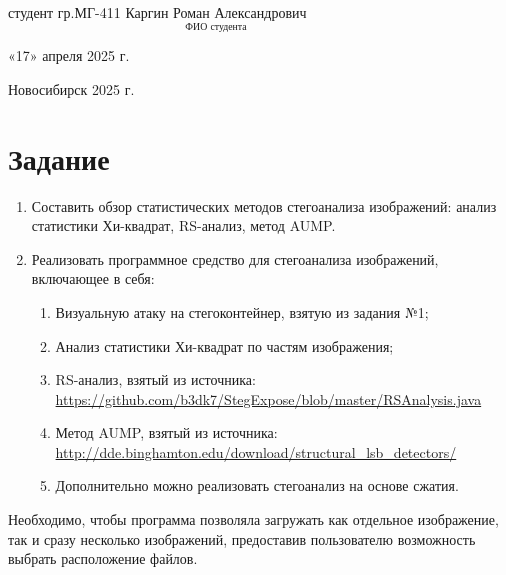 \documentclass[12pt, a4paper, english, russian]{article}
\begin{document}
\begin{titlepage}
\begin{flushleft}
\begin{large}
			студент гр.МГ-411 \hfill $\underset{\text{ФИО студента}}{\text{Каргин Роман Александрович}}$

			«17» апреля 2025 г.

		\end{large}
	\end{flushleft}

	\vfill

	\begin{center}
		\begin{large}
			Новосибирск 2025 г.
		\end{large}
	\end{center}

\end{titlepage}

\tableofcontents

\pagebreak

\section{Задание}

\begin{enumerate}
	\item Составить обзор статистических методов стегоанализа изображений:  анализ статистики Хи-квадрат, RS-анализ, метод AUMP.
	\item Реализовать программное средство для стегоанализа изображений, включающее в себя:
	      \begin{enumerate}
		      \item Визуальную атаку на стегоконтейнер, взятую из задания №1;

		      \item Анализ статистики Хи-квадрат по частям изображения;

		      \item RS-анализ, взятый из источника:  \url{https://github.com/b3dk7/StegExpose/blob/master/RSAnalysis.java}

		      \item Метод AUMP, взятый из источника: \url{http://dde.binghamton.edu/download/structural_lsb_detectors/}

		      \item Дополнительно можно реализовать стегоанализ на основе сжатия.
	      \end{enumerate}
\end{enumerate}
Необходимо, чтобы программа позволяла загружать как отдельное изображение,
так и сразу несколько изображений, предоставив пользователю возможность выбрать расположение файлов.
\end{document}
